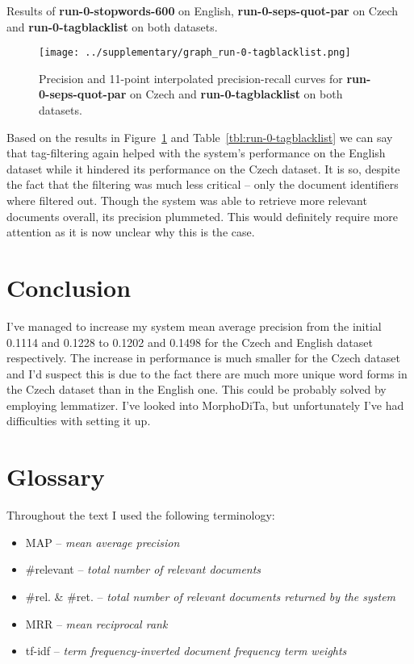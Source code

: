 \documentclass[10pt]{article}
\newcommand{\Run}[1]{\textbf{#1}}
\begin{document}
\begin{table}[h]
\centering

    \caption{Results of \Run{run-0-stopwords-600} on English,
    \Run{run-0-seps-quot-par} on Czech and \Run{run-0-tagblacklist} on both
    datasets.\label{tbl:run-0-tagblacklist}}
\end{table}

\begin{figure}[h]
\centering
\texttt{[image: ../supplementary/graph\_run-0-tagblacklist.png]}
    \caption{Precision and 11-point interpolated precision-recall curves for
    \Run{run-0-seps-quot-par} on Czech and \Run{run-0-tagblacklist} on both
    datasets.\label{fig:run-0-tagblacklist}}
\end{figure}

Based on the results in Figure~\ref{fig:run-0-tagblacklist} and
Table~\ref{tbl:run-0-tagblacklist} we can say that tag-filtering again helped
with the system's performance on the English dataset while it hindered its
performance on the Czech dataset. It is so, despite the fact that the filtering
was much less critical -- only the document identifiers where filtered out.
Though the system was able to retrieve more relevant documents overall, its
precision plummeted. This would definitely require more attention as it is now
unclear why this is the case.

\section{Conclusion}

I've managed to increase my system mean average precision from the initial
0.1114 and 0.1228 to 0.1202 and 0.1498 for the Czech and English dataset
respectively. The increase in performance is much smaller for the Czech dataset
and I'd suspect this is due to the fact there are much more unique word
forms in the Czech dataset than in the English one. This could be probably
solved by employing lemmatizer. I've looked into MorphoDiTa, but unfortunately
I've had difficulties with setting it up.

\section{Glossary}

Throughout the text I used the following terminology:
\begin{itemize}
    \item MAP -- \emph{mean average precision}
    \item \#relevant -- \emph{total number of relevant documents}
    \item \#rel. \& \#ret. -- \emph{total number of relevant documents returned
        by the system}
    \item MRR -- \emph{mean reciprocal rank}
    \item tf-idf -- \emph{term frequency-inverted document frequency term weights}
\end{itemize}
\end{document}

